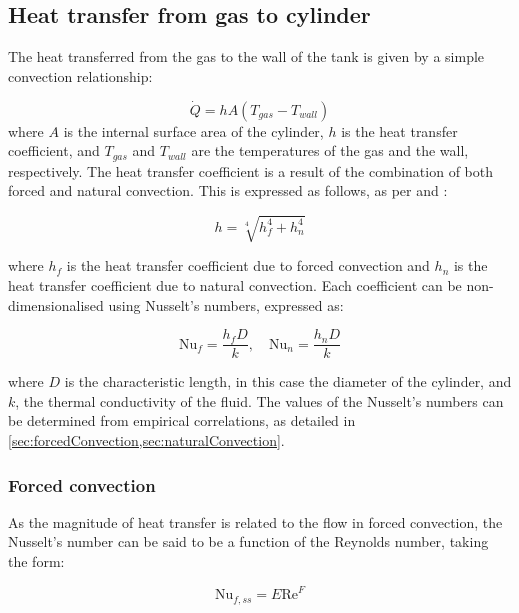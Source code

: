 

\subsection{Heat transfer from gas to cylinder}

The heat transferred from the gas to the wall of the tank is given by a simple convection relationship:

\begin{equation}
\label{equ:convection}
\dot Q = h A \left( T_{gas} - T_{wall}\right)
\end{equation}
where $A$ is the internal surface area of the cylinder, $h$ is the heat transfer coefficient, and $T_{gas}$ and $T_{wall}$ are the temperatures of the gas and the wall, respectively. The heat transfer coefficient is a result of the combination of both forced and natural convection. This is expressed as follows, as per \cite{Incropera2007} and \cite{Kakac1987}:

\begin{equation}
h = \sqrt[4]{h_f^4 + h_n^4} 
\end{equation}

\noindent where $h_f$ is the heat transfer coefficient due to forced convection and $h_n$ is the heat transfer coefficient due to natural convection. Each coefficient can be non-dimensionalised using Nusselt's numbers, expressed as:

\begin{equation}
\text{Nu}_f = \frac{h_f D}{k}, \quad \text{Nu}_n = \frac{h_n D}{k}
\end{equation}

\noindent where $D$ is the characteristic length, in this case the diameter of the cylinder, and $k$, the thermal conductivity of the fluid. The values of the Nusselt's numbers can be determined from empirical correlations, as detailed in \cref{sec:forcedConvection,sec:naturalConvection}.

\subsubsection{Forced convection}
\label{sec:forcedConvection}
As the magnitude of heat transfer is related to the flow in forced convection, the Nusselt's number can be said to be a function of the Reynolds number, taking the form:

\begin{equation}
\label{equ:nusseltReynolds}
\text{Nu}_{f,ss} = E \text{Re} ^F
\end{equation}


